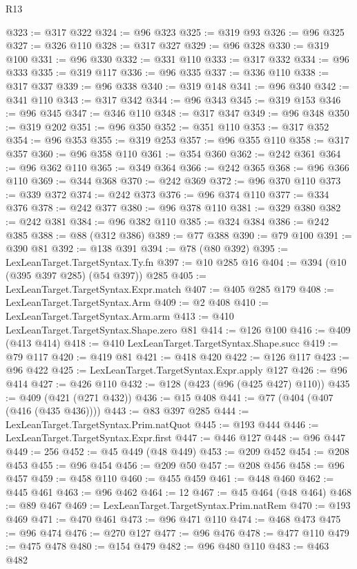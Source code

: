 \begin{lexlean}{R13}
\begin{coremodule}
{{{{{{{{{{{{{{{{{{{{{{{{{{{{{{{{{{{{{{{{{{{{{{{{{{{{{{{{{{{{{{{{{{{{{{{{{{{{{{{{{{{{{{{{{{{{{{{{{{{{{{{{{{@323 := @317 @322
@324 := @96 @323
@325 := @319 @93
@326 := @96 @325
@327 := @326 @110
@328 := @317 @327
@329 := @96 @328
@330 := @319 @100
@331 := @96 @330
@332 := @331 @110
@333 := @317 @332
@334 := @96 @333
@335 := @319 @117
@336 := @96 @335
@337 := @336 @110
@338 := @317 @337
@339 := @96 @338
@340 := @319 @148
@341 := @96 @340
@342 := @341 @110
@343 := @317 @342
@344 := @96 @343
@345 := @319 @153
@346 := @96 @345
@347 := @346 @110
@348 := @317 @347
@349 := @96 @348
@350 := @319 @202
@351 := @96 @350
@352 := @351 @110
@353 := @317 @352
@354 := @96 @353
@355 := @319 @253
@357 := @96 @355 @110
@358 := @317 @357
@360 := @96 @358 @110
@361 := @354 @360
@362 := @242 @361
@364 := @96 @362 @110
@365 := @349 @364
@366 := @242 @365
@368 := @96 @366 @110
@369 := @344 @368
@370 := @242 @369
@372 := @96 @370 @110
@373 := @339 @372
@374 := @242 @373
@376 := @96 @374 @110
@377 := @334 @376
@378 := @242 @377
@380 := @96 @378 @110
@381 := @329 @380
@382 := @242 @381
@384 := @96 @382 @110
@385 := @324 @384
@386 := @242 @385
@388 := @88 (@312 @386)
@389 := @77 @388
@390 := @79 @100
@391 := @390 @81
@392 := @138 @391
@394 := @78 (@80 @392)
@395 := LexLeanTarget.TargetSyntax.Ty.fn
@397 := @10 @285 @16
@404 := @394 (@10 (@395 @397 @285) (@54 @397)) @285
@405 := LexLeanTarget.TargetSyntax.Expr.match
@407 := @405 @285 @179
@408 := LexLeanTarget.TargetSyntax.Arm
@409 := @2 @408
@410 := LexLeanTarget.TargetSyntax.Arm.arm
@413 := @410 LexLeanTarget.TargetSyntax.Shape.zero @81
@414 := @126 @100
@416 := @409 (@413 @414)
@418 := @410 LexLeanTarget.TargetSyntax.Shape.succ
@419 := @79 @117
@420 := @419 @81
@421 := @418 @420
@422 := @126 @117
@423 := @96 @422
@425 := LexLeanTarget.TargetSyntax.Expr.apply @127
@426 := @96 @414
@427 := @426 @110
@432 := @128 (@423 (@96 (@425 @427) @110))
@435 := @409 (@421 (@271 @432))
@436 := @15 @408
@441 := @77 (@404 (@407 (@416 (@435 @436))))
@443 := @83 @397 @285
@444 := LexLeanTarget.TargetSyntax.Prim.natQuot
@445 := @193 @444
@446 := LexLeanTarget.TargetSyntax.Expr.first
@447 := @446 @127
@448 := @96 @447
@449 := 256
@452 := @45 @449 (@48 @449)
@453 := @209 @452
@454 := @208 @453
@455 := @96 @454
@456 := @209 @50
@457 := @208 @456
@458 := @96 @457
@459 := @458 @110
@460 := @455 @459
@461 := @448 @460
@462 := @445 @461
@463 := @96 @462
@464 := 12
@467 := @45 @464 (@48 @464)
@468 := @89 @467
@469 := LexLeanTarget.TargetSyntax.Prim.natRem
@470 := @193 @469
@471 := @470 @461
@473 := @96 @471 @110
@474 := @468 @473
@475 := @96 @474
@476 := @270 @127
@477 := @96 @476
@478 := @477 @110
@479 := @475 @478
@480 := @154 @479
@482 := @96 @480 @110
@483 := @463 @482
}}}}}}}}}}}}}}}}}}}}}}}}}}}}}}}}}}}}}}}}}}}}}}}}}}}}}}}}}}}}}}}}}}}}}}}}}}}}}}}}}}}}}}}}}}}}}}}}}}}}}}}}}}
\end{coremodule}
\end{lexlean}

